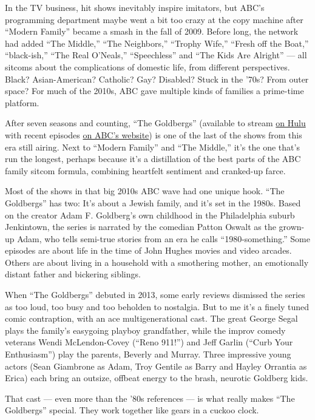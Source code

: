 In the TV business, hit shows inevitably inspire imitators, but ABC's
programming department maybe went a bit too crazy at the copy machine
after ``Modern Family'' became a smash in the fall of 2009. Before long,
the network had added ``The Middle,'' ``The Neighbors,'' ``Trophy
Wife,'' ``Fresh off the Boat,'' ``black-ish,'' ``The Real O'Neals,''
``Speechless'' and ``The Kids Are Alright'' --- all sitcoms about the
complications of domestic life, from different perspectives. Black?
Asian-American? Catholic? Gay? Disabled? Stuck in the '70s? From outer
space? For much of the 2010s, ABC gave multiple kinds of families a
prime-time platform.

After seven seasons and counting, ``The Goldbergs'' (available to stream
\href{https://www.hulu.com/series/the-goldbergs-a43a85fb-d4c8-4d11-9c28-070153643bec}{on
Hulu} with recent episodes \href{https://abc.com/shows/the-goldbergs}{on
ABC's website}) is one of the last of the shows from this era still
airing. Next to ``Modern Family'' and ``The Middle,'' it's the one
that's run the longest, perhaps because it's a distillation of the best
parts of the ABC family sitcom formula, combining heartfelt sentiment
and cranked-up farce.

Most of the shows in that big 2010s ABC wave had one unique hook. ``The
Goldbergs'' has two: It's about a Jewish family, and it's set in the
1980s. Based on the creator Adam F. Goldberg's own childhood in the
Philadelphia suburb Jenkintown, the series is narrated by the comedian
Patton Oswalt as the grown-up Adam, who tells semi-true stories from an
era he calls ``1980-something.'' Some episodes are about life in the
time of John Hughes movies and video arcades. Others are about living in
a household with a smothering mother, an emotionally distant father and
bickering siblings.

When ``The Goldbergs'' debuted in 2013, some early reviews dismissed the
series as too loud, too busy and too beholden to nostalgia. But to me
it's a finely tuned comic contraption, with an ace multigenerational
cast. The great George Segal plays the family's easygoing playboy
grandfather, while the improv comedy veterans Wendi McLendon-Covey
(``Reno 911!'') and Jeff Garlin (``Curb Your Enthusiasm'') play the
parents, Beverly and Murray. Three impressive young actors (Sean
Giambrone as Adam, Troy Gentile as Barry and Hayley Orrantia as Erica)
each bring an outsize, offbeat energy to the brash, neurotic Goldberg
kids.

That cast --- even more than the '80s references --- is what really
makes ``The Goldbergs'' special. They work together like gears in a
cuckoo clock.

